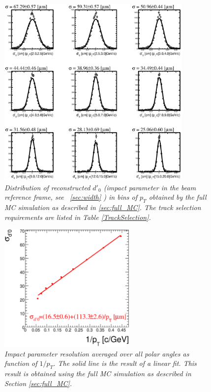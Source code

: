 \documentclass{cmspaper}
\begin{document}
\begin{figure}[htp]
  \centering
    \includegraphics[width=0.85\textwidth]{figures/fxy_d0prime_array.eps}
      
    \caption{\it Distribution of reconstructed $d'_{0}$ (impact parameter in the beam reference frame, see ~\ref{sec:width} )
      in bins of $p_{T}$ obtained by the full MC simulation as described in \ref{sec:full_MC}.
      The track selection requirements are listed in Table \ref{TrackSelection}.
    }
    \label{fig:d0prime_array}
\end{figure}

\begin{figure}[htp]
  \centering
    \includegraphics[width=0.6\textwidth]{figures/fxy_reso_d0prime_fit.eps}
      
    \caption{\it Impact parameter resolution averaged over all polar angles as function of $1/p_{T}$. The solid line is the 
      result of a linear fit. This result is obtained using the full MC simulation as described in Section \ref{sec:full_MC}.
    }
    \label{fig:reso_d0prime_fit}
\end{figure}
\end{document}
